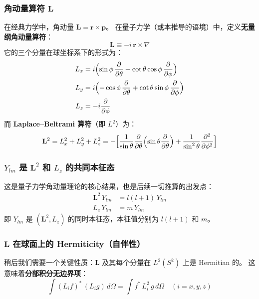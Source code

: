 \subsubsection{角动量算符 $\mathbf{L}$}

在经典力学中，角动量 $\mathbf{L} = \mathbf{r}\times\mathbf{p}$。
在量子力学（或本推导的语境）中，定义\textbf{无量纲角动量算符}：
$$
\boxed{\;\mathbf{L} \equiv -i\,\mathbf{r}\times\nabla\;}
$$
它的三个分量在球坐标系下的形式为：
\begin{align}
L_x &= i\Bigl(\sin\phi\,\frac{\partial}{\partial\theta}
       + \cot\theta\cos\phi\,\frac{\partial}{\partial\phi}\Bigr) \notag\\
L_y &= i\Bigl(-\cos\phi\,\frac{\partial}{\partial\theta}
       + \cot\theta\sin\phi\,\frac{\partial}{\partial\phi}\Bigr) \notag\\
L_z &= -i\frac{\partial}{\partial\phi} \label{eq:Lz_form}
\end{align}
而 \textbf{Laplace--Beltrami 算符}（即 $L^2$）为：
\begin{equation}
\mathbf{L}^2 = L_x^2 + L_y^2 + L_z^2
= -\Bigl[\frac{1}{\sin\theta}\frac{\partial}{\partial\theta}\Bigl(\sin\theta\frac{\partial}{\partial\theta}\Bigr)
        + \frac{1}{\sin^2\theta}\frac{\partial^2}{\partial\phi^2}\Bigr]
\label{eq:L2_form}
\end{equation}

\subsubsection{$Y_{lm}$ 是 $\mathbf{L}^2$ 和 $L_z$ 的共同本征态}

这是量子力学角动量理论的核心结果，也是后续一切推算的出发点：
\begin{align}
\mathbf{L}^2\,Y_{lm} &= l(l+1)\,Y_{lm} \label{eq:L2_eigen} \\
L_z\,Y_{lm} &= m\,Y_{lm} \label{eq:Lz_eigen}
\end{align}
即 $Y_{lm}$ 是 $(\mathbf{L}^2, L_z)$ 的同时本征态，本征值分别为 $l(l+1)$ 和 $m$。

\subsubsection{$\mathbf{L}$ 在球面上的 Hermiticity（自伴性）}

稍后我们需要一个关键性质：$\mathbf{L}$ 及其每个分量在 $L^2(S^2)$ 上是 Hermitian 的。
这意味着\textbf{分部积分无边界项}：
\begin{equation}
\int (L_i f)^*\,(L_i g)\,d\Omega = \int f^*\,L_i^2\,g\,d\Omega \quad (i=x,y,z)
\label{eq:L_Hermitian}
\end{equation}

